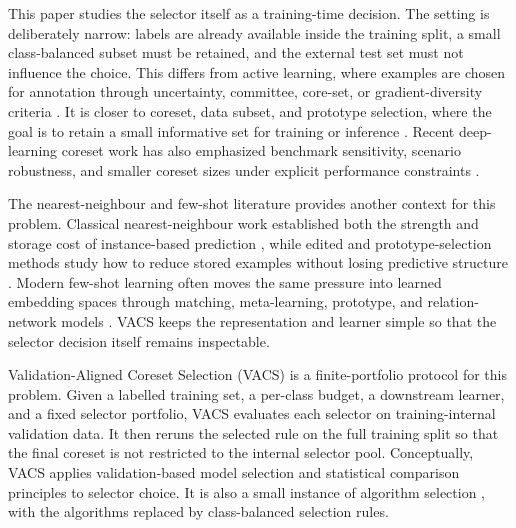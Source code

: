 \documentclass[12pt]{article}
\begin{document}
This paper studies the selector itself as a training-time decision. The setting is deliberately narrow: labels are already available inside the training split, a small class-balanced subset must be retained, and the external test set must not influence the choice. This differs from active learning, where examples are chosen for annotation through uncertainty, committee, core-set, or gradient-diversity criteria \citep{lewis1994sequential,freund1997query,settles2009active,sener2018active,ash2020deep}. It is closer to coreset, data subset, and prototype selection, where the goal is to retain a small informative set for training or inference \citep{feldman2020coresets,wei2015submodularity,bachem2017practical,mirzasoleiman2020craig,killamsetty2021glister,killamsetty2021gradmatch}. Recent deep-learning coreset work has also emphasized benchmark sensitivity, scenario robustness, and smaller coreset sizes under explicit performance constraints \citep{guo2022deepcore,xia2023moderate,xia2024refined,chen2025squaredloss}.

The nearest-neighbour and few-shot literature provides another context for this problem. Classical nearest-neighbour work established both the strength and storage cost of instance-based prediction \citep{cover1967nearest,hart1968condensed}, while edited and prototype-selection methods study how to reduce stored examples without losing predictive structure \citep{wilson1972edited,brighton2002advances,olvera2010review,garcia2012prototype}. Modern few-shot learning often moves the same pressure into learned embedding spaces through matching, meta-learning, prototype, and relation-network models \citep{vinyals2016matching,finn2017maml,snell2017prototypical,sung2018relation}. VACS keeps the representation and learner simple so that the selector decision itself remains inspectable.

Validation-Aligned Coreset Selection (VACS) is a finite-portfolio protocol for this problem. Given a labelled training set, a per-class budget, a downstream learner, and a fixed selector portfolio, VACS evaluates each selector on training-internal validation data. It then reruns the selected rule on the full training split so that the final coreset is not restricted to the internal selector pool. Conceptually, VACS applies validation-based model selection and statistical comparison principles \citep{stone1974cross,kohavi1995study,dietterich1998statistical,nadeau2003inference,dror2018hitchhiker} to selector choice. It is also a small instance of algorithm selection \citep{rice1976algorithm,kotthoff2014algorithm,thornton2013autoweka}, with the algorithms replaced by class-balanced selection rules.
\end{document}

